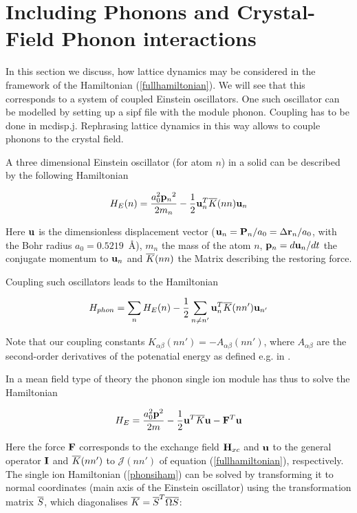 \section{Including Phonons and Crystal-Field Phonon interactions}\label{phonons}

In this section we discuss, how lattice dynamics may be considered in the framework of
the Hamiltonian (\ref{fullhamiltonian}). We will see that this corresponds 
to a system of coupled Einstein oscillators. One such oscillator can be modelled 
by setting up a {\prg sipf} file with the module {\prg phonon}. Coupling has
to be done in {\prg mcdisp.j}. Rephrasing lattice dynamics in this way allows 
to couple phonons to the crystal field.

A three dimensional Einstein oscillator (for atom $n$) in a solid can be described by 
the following Hamiltonian

\begin{equation}\label{einstein}
H_E(n)=\frac{a_0^2{\mathbf p_n}^2}{2m_n} - \frac{1}{2} {\mathbf u}^T_n \overline{K}(nn) {\mathbf u}_n
\end{equation}

Here $\mathbf u$ is the dimensionless displacement vector ($\mathbf u_n={\mathbf P}_n/a_0=\Delta {\mathbf r}_n/a_0$, 
with the Bohr radius $a_0=0.5219$~\AA), $m_n$ the
mass of the atom $n$, $\mathbf p_n=d\mathbf u_n/dt$ the conjugate momentum to $\mathbf u_n$ and
$\overline{K}(nn)$ the Matrix describing the restoring force.

Coupling such oscillators leads to the Hamiltonian

\begin{equation}
H_{phon}=\sum_n H_E(n) -\frac{1}{2} \sum_{n\neq n'} {\mathbf u}_n^T \overline{K}(nn')  {\mathbf u}_{n'}
\end{equation}

Note that our coupling constants $K_{\alpha\beta}(nn')=-A_{\alpha\beta}(nn')$, where
 $A_{\alpha\beta}$ are the second-order derivatives of the potenatial energy
as defined e.g. in \cite[page 99]{lovesey84-1}.

In a mean field type of theory 
the phonon single ion module has thus to solve the Hamiltonian

\begin{equation}\label{phonsiham}
H_E=\frac{a_0^2{\mathbf p}^2}{2m} - \frac{1}{2} {\mathbf u}^T \overline{K} {\mathbf u} - {\mathbf F}^T {\mathbf u}
\end{equation}

Here the force $\mathbf F$ corresponds to the exchange field $\mathbf H_{xc}$ and $\mathbf u$ to
 the general operator $\mathbf I$ and $\overline{K}(nn')$ to $\mathcal J(nn')$ of equation (\ref{fullhamiltonian}),
respectively. The single ion Hamiltonian (\ref{phonsiham}) can be solved by transforming
it to normal coordinates (main axis of the Einstein oscillator) using the transformation
matrix $\overline{S}$, which diagonalises $\overline{K}=\overline{S}^T\overline{\Omega}\overline{S}$:

